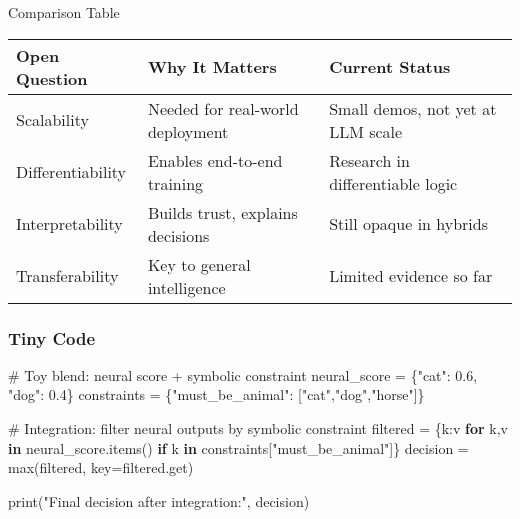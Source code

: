 \documentclass[
  letterpaper,
  DIV=11,
  numbers=noendperiod]{scrreprt}
\newenvironment{Shaded}{\begin{snugshade}}{\end{snugshade}}
\newcommand{\BuiltInTok}[1]{\textcolor[rgb]{0.00,0.23,0.31}{#1}}
\newcommand{\CommentTok}[1]{\textcolor[rgb]{0.37,0.37,0.37}{#1}}
\newcommand{\ControlFlowTok}[1]{\textcolor[rgb]{0.00,0.23,0.31}{\textbf{#1}}}
\newcommand{\FloatTok}[1]{\textcolor[rgb]{0.68,0.00,0.00}{#1}}
\newcommand{\KeywordTok}[1]{\textcolor[rgb]{0.00,0.23,0.31}{\textbf{#1}}}
\newcommand{\NormalTok}[1]{\textcolor[rgb]{0.00,0.23,0.31}{#1}}
\newcommand{\OperatorTok}[1]{\textcolor[rgb]{0.37,0.37,0.37}{#1}}
\newcommand{\StringTok}[1]{\textcolor[rgb]{0.13,0.47,0.30}{#1}}
\begin{document}
Comparison Table

\begin{longtable}[]{@{}
  >{\raggedright\arraybackslash}p{}
  >{\raggedright\arraybackslash}p{}
  >{\raggedright\arraybackslash}p{}@{}}
\toprule\noalign{}
\begin{minipage}[b]{\linewidth}\raggedright
Open Question
\end{minipage} & \begin{minipage}[b]{\linewidth}\raggedright
Why It Matters
\end{minipage} & \begin{minipage}[b]{\linewidth}\raggedright
Current Status
\end{minipage} \\
\midrule\noalign{}
\endhead
\bottomrule\noalign{}
\endlastfoot
Scalability & Needed for real-world deployment & Small demos, not yet at
LLM scale \\
Differentiability & Enables end-to-end training & Research in
differentiable logic \\
Interpretability & Builds trust, explains decisions & Still opaque in
hybrids \\
Transferability & Key to general intelligence & Limited evidence so
far \\
\end{longtable}

\subsubsection{Tiny Code}\label{tiny-code-59}

\begin{Shaded}
\begin{Highlighting}[]
\CommentTok{\# Toy blend: neural score + symbolic constraint}
\NormalTok{neural\_score }\OperatorTok{=}\NormalTok{ \{}\StringTok{"cat"}\NormalTok{: }\FloatTok{0.6}\NormalTok{, }\StringTok{"dog"}\NormalTok{: }\FloatTok{0.4}\NormalTok{\}}
\NormalTok{constraints }\OperatorTok{=}\NormalTok{ \{}\StringTok{"must\_be\_animal"}\NormalTok{: [}\StringTok{"cat"}\NormalTok{,}\StringTok{"dog"}\NormalTok{,}\StringTok{"horse"}\NormalTok{]\}}

\CommentTok{\# Integration: filter neural outputs by symbolic constraint}
\NormalTok{filtered }\OperatorTok{=}\NormalTok{ \{k:v }\ControlFlowTok{for}\NormalTok{ k,v }\KeywordTok{in}\NormalTok{ neural\_score.items() }\ControlFlowTok{if}\NormalTok{ k }\KeywordTok{in}\NormalTok{ constraints[}\StringTok{"must\_be\_animal"}\NormalTok{]\}}
\NormalTok{decision }\OperatorTok{=} \BuiltInTok{max}\NormalTok{(filtered, key}\OperatorTok{=}\NormalTok{filtered.get)}

\BuiltInTok{print}\NormalTok{(}\StringTok{"Final decision after integration:"}\NormalTok{, decision)}
\end{Highlighting}
\end{Shaded}
\end{document}

